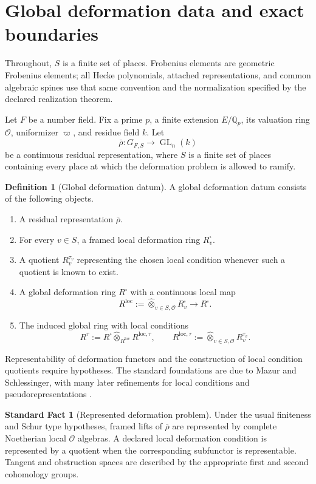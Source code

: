 \documentclass[11pt]{amsart}
\theoremstyle{definition}
\newtheorem{definition}[definition]{Definition}
\newtheorem{standardfact}[standardfact]{Standard Fact}
\theoremstyle{remark}
\newcommand{\OO}{\mathcal O}
\newcommand{\QQ}{\mathbb Q}
\newcommand{\GL}{\operatorname{GL}}
\newcommand{\wideotimes}{\mathbin{\widehat\otimes}}
\begin{document}
\section{Global deformation data and exact boundaries}\label{sec:global_data}

Throughout, \(S\) is a finite set of places. Frobenius elements are geometric Frobenius elements; all Hecke polynomials, attached representations, and common algebraic spines use that same convention and the normalization specified by the declared realization theorem.


Let \(F\) be a number field. Fix a prime \(p\), a finite extension \(E/\QQ_p\), its valuation ring \(\OO\), uniformizer \(\varpi\), and residue field \(k\). Let
\[
\bar\rho:G_{F,S}\longrightarrow\GL_n(k)
\]
be a continuous residual representation, where \(S\) is a finite set of places containing every place at which the deformation problem is allowed to ramify.

\begin{definition}[Global deformation datum]\label{def:global_datum}
A global deformation datum consists of the following objects.
\begin{enumerate}
\item A residual representation \(\bar\rho\).
\item For every \(v\in S\), a framed local deformation ring \(R_v^\square\).
\item A quotient \(R_v^{\tau_v}\) representing the chosen local condition whenever such a quotient is known to exist.
\item A global deformation ring \(R^\square\) with a continuous local map
\[
R^{\mathrm{loc}}:=\wideotimes_{v\in S,\OO}R_v^\square
\longrightarrow R^\square.
\]
\item The induced global ring with local conditions
\[
R^{\tau}:=R^\square\wideotimes_{R^{\mathrm{loc}}}R^{\mathrm{loc},\tau},
\qquad
R^{\mathrm{loc},\tau}:=\wideotimes_{v\in S,\OO}R_v^{\tau_v}.
\]
\end{enumerate}
\end{definition}

Representability of deformation functors and the construction of local condition quotients require hypotheses. The standard foundations are due to Mazur and Schlessinger, with many later refinements for local conditions and pseudorepresentations \cite{Mazur1989,Schlessinger1968,BellaicheChenevier2009}.

\begin{standardfact}[Represented deformation problem]\label{fact:represented_deformation}
Under the usual finiteness and Schur type hypotheses, framed lifts of \(\bar\rho\) are represented by complete Noetherian local \(\OO\) algebras. A declared local deformation condition is represented by a quotient when the corresponding subfunctor is representable. Tangent and obstruction spaces are described by the appropriate first and second cohomology groups.
\end{standardfact}
\end{document}
